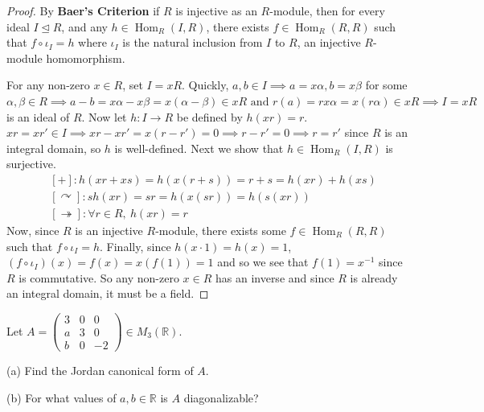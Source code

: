 \documentclass[addpoints,10pt]{exam}
\theoremstyle{plain}
\theoremstyle{definition}
\newtheorem{prob}[thm]{Problem}
\theoremstyle{plain}
\theoremstyle{plain}
\theoremstyle{definition}
\let\oldprob\prob
\let\endoldprob\endprob
\renewenvironment{prob}
  {\begin{singlespace}\oldprob}
  {\endoldprob\end{singlespace}}
\newcommand{\Hom}{\ensuremath{\operatorname{Hom}}}
\begin{document}
\begin{proof}
By \textbf{Baer's Criterion} if $R$ is injective as an $R$-module, then for every ideal $I\trianglelefteq R$, and any $h\in \Hom_{R}(I,R)$, there exists $f\in \Hom_{R}(R,R)$ such that $f\circ \iota_{I}=h$ where $\iota_{I}$ is the natural inclusion from $I$ to $R$, an injective $R$-module homomorphism.

For any non-zero $x\in R$, set $I=xR$. Quickly, $a,b\in I\implies a=x\alpha,b=x\beta$ for some $\alpha,\beta\in R\implies a-b=x\alpha-x\beta=x(\alpha-\beta)\in xR\text{ and }r(a)=rx\alpha=x(r\alpha)\in xR\implies I=xR$ is an ideal of $R$. Now let $h:I\to R$ be defined by $h(xr)=r$. $xr=xr'\in I\implies xr-xr'=x(r-r')=0\implies r-r'=0\implies r=r'$ since $R$ is an integral domain, so $h$ is well-defined. Next we show that $h\in \Hom_{R}(I,R)$ is surjective.
\begin{align*}
&[+]:h(xr+xs)=h(x(r+s))=r+s=h(xr)+h(xs)\\
&[\curvearrowright]:s h(xr)=sr=h(x(sr))=h(s(xr))\\
&[\twoheadrightarrow]:\forall r\in R,\ h(xr)=r
\end{align*}
Now, since $R$ is an injective $R$-module, there exists some $f\in \Hom_{R}(R,R)$ such that $f\circ \iota_{I}=h$. Finally, since $h(x\cdot 1)=h(x)=1$, $(f\circ \iota_{I})(x)=f(x)=x(f(1))=1$ and so we see that $f(1)=x^{-1}$ since $R$ is commutative. So any non-zero $x\in R$ has an inverse and since $R$ is already an integral domain, it must be a field.

\end{proof}
\newpage
\begin{prob}
Let
$
A=
\begin{pmatrix}
3 & 0 & 0\\
a & 3 & 0\\
b & 0 & -2
\end{pmatrix}
\in M_3(\mathbb{R}).
$

(a) Find the Jordan canonical form of $A$.

(b) For what values of $a,b\in \mathbb{R}$ is $A$ diagonalizable?
\end{prob}
\end{document}
